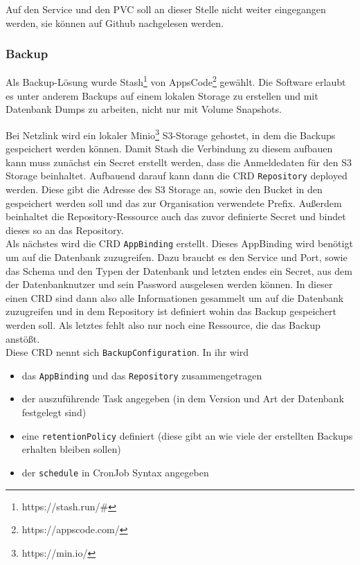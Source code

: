 Auf den Service und den \ac{PVC} soll an dieser Stelle nicht weiter eingegangen werden, sie können auf Github nachgelesen werden. 


\hfill \newline
\subsubsection{Backup}
Als Backup-Lösung wurde Stash\footnote{https://stash.run/\#} von AppsCode\footnote{https://appscode.com/} gewählt.
Die Software erlaubt es unter anderem Backups auf einem lokalen Storage zu erstellen und mit Datenbank Dumps zu arbeiten, nicht nur mit Volume Snapshots.

Bei Netzlink wird ein lokaler Minio\footnote{https://min.io/} \ac{S3}-Storage gehostet, in dem die Backups gespeichert werden können.
Damit Stash die Verbindung zu diesem aufbauen kann muss zunächst ein Secret erstellt werden, dass die Anmeldedaten für den \ac{S3} Storage beinhaltet.
Aufbauend darauf kann dann die \ac{CRD} \texttt{Repository} deployed werden. 
Diese gibt die Adresse des \ac{S3} Storage an, sowie den Bucket in den gespeichert werden soll und das zur Organisation verwendete Prefix.
Außerdem beinhaltet die Repository-Ressource auch das zuvor definierte Secret und bindet dieses so an das Repository.
\\
Als nächstes wird die \ac{CRD} \texttt{AppBinding} erstellt. 
Dieses AppBinding wird benötigt um auf die Datenbank zuzugreifen. 
Dazu braucht es den Service und Port, sowie das Schema und den Typen der Datenbank und letzten endes ein Secret, aus dem der Datenbanknutzer und sein Password ausgelesen werden können.
In dieser einen \ac{CRD} sind dann also alle Informationen gesammelt um auf die Datenbank zuzugreifen und in dem Repository ist definiert wohin das Backup gespeichert werden soll.
Als letztes fehlt also nur noch eine Ressource, die das Backup anstößt.
\\
Diese \ac{CRD} nennt sich \texttt{BackupConfiguration}. 
In ihr wird 
\begin{itemize}
    \item das \texttt{AppBinding} und das \texttt{Repository} zusammengetragen
    \item der auszuführende Task angegeben (in dem Version und Art der Datenbank festgelegt sind)
    \item eine \texttt{retentionPolicy} definiert (diese gibt an wie viele der erstellten Backups erhalten bleiben sollen)
    \item der \texttt{schedule} in CronJob Syntax angegeben
\end{itemize}
